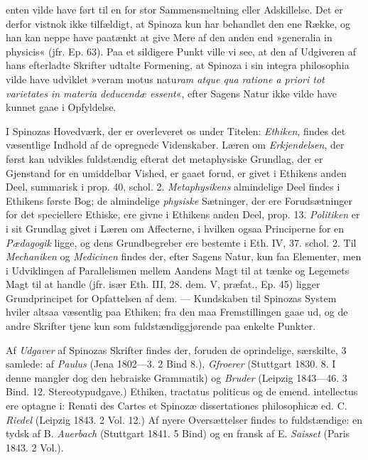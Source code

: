 \documentclass[12pt,a4paper]{book}
\newcommand{\opage}[1]{\marginnote{\footnotesize\textit{[#1]}}}
\begin{document}
enten vilde have ført til en for stor Sammensmeltning eller Adskillelse.
Det er derfor vistnok ikke tilfældigt, at Spinoza kun har behandlet den
ene Række, og han kan neppe have paatænkt at give Mere af den anden end
»generalia in physicis« (jfr. Ep. 63). Paa et sildigere Punkt ville vi
see, at den af Udgiveren af hans efterladte Skrifter udtalte Formening, at
Spinoza i sin integra philosophia vilde have udviklet »veram motus
natu\emph{ram atque qua ratione a priori tot varietates in materia
deducendæ essent}«, efter Sagens Natur ikke vilde have kunnet gaae i
Opfyldelse.

I Spinozas Hovedværk, der er overleveret os under Titelen:
\emph{Ethiken}, findes det væsentlige Indhold af de opregnede
Videnskaber. Læren om \emph{Erkjendelsen}, der først
\opage{43} kan udvikles fuldstændig efterat det metaphysiske Grundlag, der er
Gjenstand for en umiddelbar Vished, er gaaet forud, er givet i Ethikens
anden Deel, summarisk i prop. 40, schol. 2. \emph{Metaphysikens}
almindelige Deel findes i Ethikens første Bog; de almindelige
\emph{physiske} Sætninger, der ere Forudsætninger for det speciellere
Ethiske, ere givne i Ethikens anden Deel, prop. 13. \emph{Politiken} er i
sit Grundlag givet i Læren om Affecterne, i hvilken ogsaa Principerne for
en \emph{Pædagogik} ligge, og dens Grundbegreber ere bestemte i Eth. IV,
37. schol. 2. Til \emph{Mechaniken} og \emph{Medicinen} findes der, efter
Sagens Natur, kun faa Elementer, men i Udviklingen af Parallelismen mellem
Aandens Magt til at tænke og Legemets Magt til at handle (jfr. især Eth.
III, 28. dem. V, præfat., Ep. 45) ligger Grundprincipet for Opfattelsen af
dem. --- Kundskaben til Spinozas System hviler altsaa væsentlig paa
Ethiken; fra den maa Fremstillingen gaae ud, og de andre Skrifter tjene
kun som fuldstændiggjørende paa enkelte Punkter.

Af \emph{Udgaver} af Spinozas Skrifter findes der, foruden de
oprindelige, særskilte, 3 samlede: af \emph{Paulus} (Jena 1802---3. 2 Bind
8.), \emph{Gfroerer} (Stuttgart 1830. 8. I denne mangler dog den hebraiske
Grammatik) og \emph{Bruder} (Leipzig 1843---46. 3 Bind. 12.
Stereotypudgave.) Ethiken, tractatus politicus og de emend. intellectus
ere optagne i: Renati des Cartes et Spinozæ dissertationes philosophicæ
ed. C. \emph{Riedel} (Leipzig 1843. 2 Vol. 12.) Af nyere Oversættelser
findes to fuldstændige: en tydsk af B. \emph{Auerbach} (Stuttgart 1841. 5
Bind) og en fransk af E. \emph{Saisset} (Paris 1843. 2 Vol.).
\end{document}
